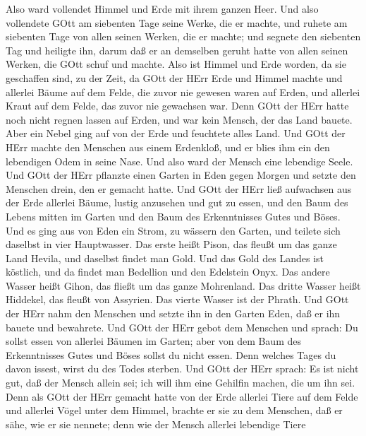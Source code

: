  Also ward vollendet Himmel und Erde mit ihrem ganzen Heer.
 Und also vollendete GOtt am siebenten Tage seine Werke, die
er machte, und ruhete am siebenten Tage von allen seinen Werken, die er
machte;  und segnete den siebenten Tag und heiligte ihn,
darum daß er an demselben geruht hatte von allen seinen Werken, die GOtt
schuf und machte.  Also ist Himmel und Erde worden, da sie
geschaffen sind, zu der Zeit, da GOtt der HErr Erde und Himmel machte
 und allerlei Bäume auf dem Felde, die zuvor nie gewesen
waren auf Erden, und allerlei Kraut auf dem Felde, das zuvor nie
gewachsen war. Denn GOtt der HErr hatte noch nicht regnen lassen auf
Erden, und war kein Mensch, der das Land bauete.  Aber ein
Nebel ging auf von der Erde und feuchtete alles Land.  Und
GOtt der HErr machte den Menschen aus einem Erdenkloß, und er blies ihm
ein den lebendigen Odem in seine Nase. Und also ward der Mensch eine
lebendige Seele.  Und GOtt der HErr pflanzte einen Garten in
Eden gegen Morgen und setzte den Menschen drein, den er gemacht hatte.
 Und GOtt der HErr ließ aufwachsen aus der Erde allerlei
Bäume, lustig anzusehen und gut zu essen, und den Baum des Lebens mitten
im Garten und den Baum des Erkenntnisses Gutes und Böses. 
Und es ging aus von Eden ein Strom, zu wässern den Garten, und teilete
sich daselbst in vier Hauptwasser.  Das erste heißt Pison,
das fleußt um das ganze Land Hevila, und daselbst findet man Gold.
 Und das Gold des Landes ist köstlich, und da findet man
Bedellion und den Edelstein Onyx.  Das andere Wasser heißt
Gihon, das fließt um das ganze Mohrenland.  Das dritte
Wasser heißt Hiddekel, das fleußt von Assyrien. Das vierte Wasser ist
der Phrath.  Und GOtt der HErr nahm den Menschen und setzte
ihn in den Garten Eden, daß er ihn bauete und bewahrete. 
Und GOtt der HErr gebot dem Menschen und sprach: Du sollst essen von
allerlei Bäumen im Garten;  aber von dem Baum des
Erkenntnisses Gutes und Böses sollst du nicht essen. Denn welches Tages
du davon issest, wirst du des Todes sterben.  Und GOtt der
HErr sprach: Es ist nicht gut, daß der Mensch allein sei; ich will ihm
eine Gehilfin machen, die um ihn sei.  Denn als GOtt der
HErr gemacht hatte von der Erde allerlei Tiere auf dem Felde und
allerlei Vögel unter dem Himmel, brachte er sie zu dem Menschen, daß er
sähe, wie er sie nennete; denn wie der Mensch allerlei lebendige Tiere
